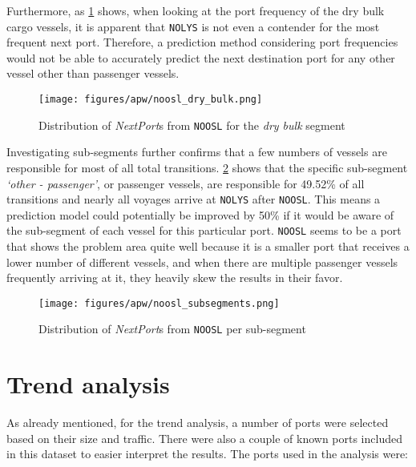 Furthermore, as \cref{fig:apw_noosl_dry_bulk} shows, when looking at the port frequency of the dry bulk cargo vessels, it is apparent that \texttt{NOLYS} is not even a contender for the most frequent next port. Therefore, a prediction method considering port frequencies would not be able to accurately predict the next destination port for any other vessel other than passenger vessels.

\begin{figure}[htbp]
    \centering
    \texttt{[image: figures/apw/noosl\_dry\_bulk.png]}
    \caption{Distribution of \textit{NextPort}s from \texttt{NOOSL} for the \textit{dry bulk} segment}
    \label{fig:apw_noosl_dry_bulk}
\end{figure}

Investigating sub-segments further confirms that a few numbers of vessels are responsible for most of all total transitions. \cref{fig:apw_noosl_subsegments} shows that the specific sub-segment \textit{`other - passenger'}, or passenger vessels, are responsible for 49.52\% of all transitions and nearly all voyages arrive at \texttt{NOLYS} after \texttt{NOOSL}. This means a prediction model could potentially be improved by 50\% if it would be aware of the sub-segment of each vessel for this particular port. \texttt{NOOSL} seems to be a port that shows the problem area quite well because it is a smaller port that receives a lower number of different vessels, and when there are multiple passenger vessels frequently arriving at it, they heavily skew the results in their favor.%

\begin{figure}[htbp]
    \centering
    \texttt{[image: figures/apw/noosl\_subsegments.png]}
    \caption{Distribution of \textit{NextPort}s from \texttt{NOOSL} per sub-segment}
    \label{fig:apw_noosl_subsegments}
\end{figure}


\section{Trend analysis}
\label{sec:trend_analysis}

As already mentioned, for the trend analysis, a number of ports were selected based on their size and traffic. There were also a couple of known ports included in this dataset to easier interpret the results. The ports used in the analysis were:

